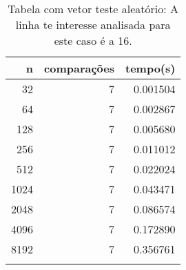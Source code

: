 \begin{table}[ht]
\centering
\begin{tabular}{rrr} \toprule
        n &    comparações &       tempo(s) \\ \midrule
      32  &              7 &      0.001504 \\
      64  &              7 &      0.002867 \\
     128  &              7 &      0.005680 \\
     256  &              7 &      0.011012 \\
     512  &              7 &      0.022024 \\
    1024  &              7 &      0.043471 \\
    2048  &              7 &      0.086574 \\
    4096  &              7 &      0.172890 \\
    8192  &              7 &      0.356761 \\
\bottomrule\addlinespace
\end{tabular}
\caption{Tabela com vetor teste aleatório: A linha te interesse analisada para este caso é a 16.}
\label{tab:radixsortAleatorio}
\end{table}
